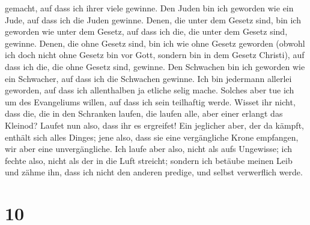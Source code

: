 gemacht, auf dass ich ihrer viele gewinne.  Den Juden bin
ich geworden wie ein Jude, auf dass ich die Juden gewinne. Denen, die
unter dem Gesetz sind, bin ich geworden wie unter dem Gesetz, auf dass
ich die, die unter dem Gesetz sind, gewinne.  Denen, die
ohne Gesetz sind, bin ich wie ohne Gesetz geworden (obwohl ich doch
nicht ohne Gesetz bin vor Gott, sondern bin in dem Gesetz Christi), auf
dass ich die, die ohne Gesetz sind, gewinne.  Den
Schwachen bin ich geworden wie ein Schwacher, auf dass ich die Schwachen
gewinne. Ich bin jedermann allerlei geworden, auf dass ich allenthalben
ja etliche selig mache.  Solches aber tue ich um des
Evangeliums willen, auf dass ich sein teilhaftig werde. 
Wisset ihr nicht, dass die, die in den Schranken laufen, die laufen
alle, aber einer erlangt das Kleinod? Laufet nun also, dass ihr es
ergreifet!  Ein jeglicher aber, der da kämpft, enthält
sich alles Dinges; jene also, dass sie eine vergängliche Krone
empfangen, wir aber eine unvergängliche.  Ich laufe aber
also, nicht als aufs Ungewisse; ich fechte also, nicht als der in die
Luft streicht;  sondern ich betäube meinen Leib und zähme
ihn, dass ich nicht den anderen predige, und selbst verwerflich werde.

\hypertarget{section-9}{%
\section{10}\label{section-9}}

